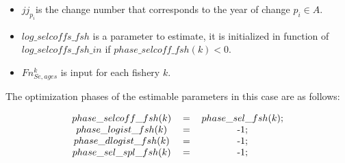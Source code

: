 \documentclass{article}
\begin{document}
\begin{itemize}
    
    \begin{itemize}
        \item $jj_{p_i}$is the change number that corresponds to the year of change $p_i\in A$.
        \item $log\_selcoffs\_fsh$ is a parameter to estimate, it is initialized in function of  $log\_selcoffs\_fsh\_in$ if $phase\_selcoff\_fsh(k)<0$. %
        \item $Fn_{Se,ages}^k$ is input for each fishery $k$.
    \end{itemize}
The optimization phases of the estimable parameters in this case are as follows:
\begin{table}[H]
    \centering
    \begin{equation}
    \begin{tabular}{c c c}
        $phase\_selcoff\_fsh(k)$ & = & $phase\_sel\_fsh(k)$;\\
        $phase\_logist\_fsh(k)$ & = & -1;\\
       $ phase\_dlogist\_fsh(k)$ & = & -1;\\
        $phase\_sel\_spl\_fsh(k)$ & = & -1;
    \end{tabular}
    \end{equation}
    \label{tab: phase1}
\end{table}












    
   

\end{itemize}
\end{document}
